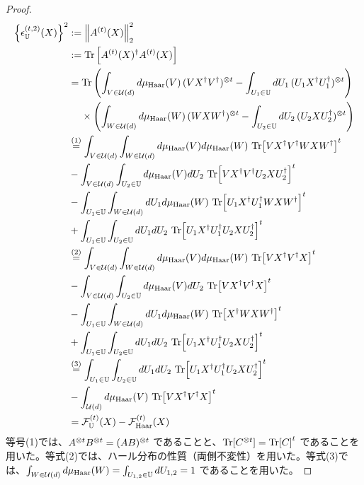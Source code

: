 \begin{proof}
    \begin{align}
        \qty{\epsilon_{\mathbb{U}}^{(t,2)}(X)}^2
        &:= \norm{A^{(t)}(X)}_2^2\\
        &:= \Tr\qty[A^{(t)}(X)^\dagger A^{(t)}(X)]\\
        &= \Tr\qty(\int_{V\in\mathcal{U}(d)} d\mu_{\mathrm{Haar}}(V)\,(VX^\dagger V^\dagger)^{\otimes {t}} - \int_{U_1\in\mathbb{U}} dU_1\,(U_1X^\dagger U_1^\dagger)^{\otimes {t}}) \nonumber\\
        &\quad\; \times \qty(\int_{W\in\mathcal{U}(d)} d\mu_{\mathrm{Haar}}(W)\,(WXW^\dagger)^{\otimes {t}} - \int_{U_2\in\mathbb{U}} dU_2\,(U_2XU_2^\dagger)^{\otimes {t}})\\
        &\overset{(1)}{=} \int_{V\in\mathcal{U}(d)}\int_{W\in\mathcal{U}(d)} d\mu_{\mathrm{Haar}}(V)d\mu_{\mathrm{Haar}}(W)\, \Tr[VX^\dagger V^\dagger WXW^\dagger]^t \nonumber\\
        &- \int_{V\in\mathcal{U}(d)}\int_{U_2\in\mathbb{U}} d\mu_{\mathrm{Haar}}(V)dU_2\, \Tr[VX^\dagger V^\dagger U_2XU_2^\dagger]^t\nonumber\\
        &- \int_{U_1\in\mathbb{U}}\int_{W\in\mathcal{U}(d)} dU_1d\mu_{\mathrm{Haar}}(W)\, \Tr[U_1X^\dagger U_1^\dagger WXW^\dagger]^t \nonumber\\
        &+ \int_{U_1\in\mathbb{U}}\int_{U_2\in\mathbb{U}} dU_1dU_2\, \Tr[U_1X^\dagger U_1^\dagger U_2XU_2^\dagger]^t\\
        &\overset{(2)}{=} \int_{V\in\mathcal{U}(d)}\int_{W\in\mathcal{U}(d)} d\mu_{\mathrm{Haar}}(V)d\mu_{\mathrm{Haar}}(W)\, \Tr[VX^\dagger V^\dagger X]^t \nonumber\\
        &- \int_{V\in\mathcal{U}(d)}\int_{U_2\in\mathbb{U}} d\mu_{\mathrm{Haar}}(V)dU_2\, \Tr[VX^\dagger V^\dagger X]^t \nonumber\\
        &- \int_{U_1\in\mathbb{U}}\int_{W\in\mathcal{U}(d)} dU_1d\mu_{\mathrm{Haar}}(W)\, \Tr[X^\dagger WXW^\dagger]^t \nonumber\\
        &+ \int_{U_1\in\mathbb{U}}\int_{U_2\in\mathbb{U}} dU_1dU_2\, \Tr[U_1X^\dagger U_1^\dagger U_2XU_2^\dagger]^t\\
        &\overset{(3)}{=} \int_{U_1\in\mathbb{U}}\int_{U_2\in\mathbb{U}} dU_1dU_2\, \Tr[U_1X^\dagger U_1^\dagger U_2XU_2^\dagger]^t \nonumber\\
        &- \int_{\mathcal{U}(d)} d\mu_{\mathrm{Haar}}(V)\, \Tr[VX^\dagger V^\dagger X]^t\\
        &= \mathcal{F}_{\mathbb{U}}^{(t)}(X) - \mathcal{F}_{\mathrm{Haar}}^{(t)}(X)
    \end{align}
    等号(1)では、$A^{\otimes {t}} B^{\otimes {t}} = (AB)^{\otimes {t}}$ であることと、$\Tr[C^{\otimes {t}}] = \Tr[C]^t$ であることを用いた。等式(2)では、ハール分布の性質（両側不変性）を用いた。等式(3)では、$\int_{W\in\mathcal{U}(d)} d\mu_{\mathrm{Haar}}(W) = \int_{U_{1,2}\in\mathbb{U}} dU_{1,2} = 1$ であることを用いた。
\end{proof}


